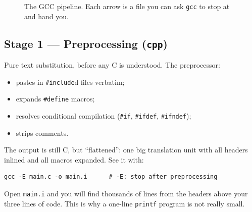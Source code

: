 \documentclass[11pt,a4paper,oneside]{book}
\newcommand{\code}[1]{\texttt{#1}}
\begin{document}
\begin{figure}[h]
\centering
{}
\caption{The GCC pipeline. Each arrow is a file you can ask \code{gcc} to stop
at and hand you.}
\label{fig:gcc-pipeline}
\end{figure}

\subsection{Stage 1 --- Preprocessing (\code{cpp})}
Pure text substitution, before any C is understood. The preprocessor:
\begin{itemize}[leftmargin=1.4cm]
  \item pastes in \code{\#include}d files verbatim;
  \item expands \code{\#define} macros;
  \item resolves conditional compilation (\code{\#if}, \code{\#ifdef},
        \code{\#ifndef});
  \item strips comments.
\end{itemize}
The output is still C, but ``flattened'': one big translation unit with all
headers inlined and all macros expanded. See it with:
\begin{lstlisting}[style=shell]
gcc -E main.c -o main.i      # -E: stop after preprocessing
\end{lstlisting}
Open \code{main.i} and you will find thousands of lines from the headers above
your three lines of code. This is why a one-line \code{printf} program is not
really small.
\end{document}
